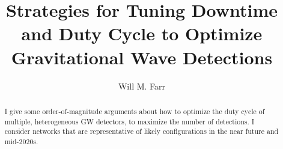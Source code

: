 \documentclass[modern]{aastex63}
\begin{document}
\title{Strategies for Tuning Downtime and Duty Cycle to Optimize Gravitational
Wave Detections}
\author[0000-0003-1540-8562]{Will M. Farr}

\begin{abstract} I give some order-of-magnitude arguments about how to optimize
the duty cycle of multiple, heterogeneous GW detectors, to maximize the number
of detections.  I consider networks that are representative of likely
configurations in the near future and mid-2020s. \end{abstract}

\section*{ }


\end{document}
